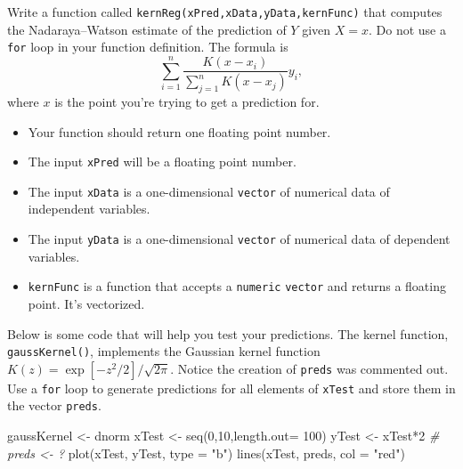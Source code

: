 \documentclass[
  12pt,
  krantz2]{krantz}
\makeatletter
\newenvironment{Shaded}{\begin{snugshade}}{\end{snugshade}}
\newcommand{\AttributeTok}[1]{\textcolor[rgb]{0.61,0.61,0.61}{#1}}
\newcommand{\CommentTok}[1]{\textcolor[rgb]{0.37,0.37,0.37}{\textit{#1}}}
\newcommand{\DecValTok}[1]{\textcolor[rgb]{0.06,0.06,0.06}{#1}}
\newcommand{\FunctionTok}[1]{\textcolor[rgb]{0,0,0}{#1}}
\newcommand{\NormalTok}[1]{#1}
\newcommand{\OtherTok}[1]{\textcolor[rgb]{0.37,0.37,0.37}{#1}}
\newcommand{\SpecialCharTok}[1]{\textcolor[rgb]{0,0,0}{#1}}
\newcommand{\StringTok}[1]{\textcolor[rgb]{0.5,0.5,0.5}{#1}}
\providecommand{\tightlist}{%
  \setlength{\itemsep}{0pt}\setlength{\parskip}{0pt}}
\newenvironment{kframe}{%
\medskip{}
\setlength{\fboxsep}{.8em}
 \def\at@end@of@kframe{}%
 \ifinner\ifhmode%
  \def\at@end@of@kframe{\end{minipage}}%
  \begin{minipage}{\columnwidth}%
 \fi\fi%
 \def\FrameCommand##1{\hskip\@totalleftmargin \hskip-\fboxsep
 \colorbox{shadecolor}{##1}\hskip-\fboxsep
     \hskip-\linewidth \hskip-\@totalleftmargin \hskip\columnwidth}%
 \MakeFramed {\advance\hsize-\width
   \@totalleftmargin\z@ \linewidth\hsize
   \@setminipage}}%
 {\par\unskip\endMakeFramed%
 \at@end@of@kframe}
\renewenvironment{Shaded}{\begin{kframe}}{\end{kframe}}
\makeatother
\begin{document}
Write a function called \texttt{kernReg(xPred,xData,yData,kernFunc)} that computes the Nadaraya--Watson estimate of the prediction of \(Y\) given \(X=x\). Do not use a \texttt{for} loop in your function definition. The formula is
\begin{equation} 
\sum_{i=1}^n \frac{K(x-x_i)}{\sum_{j=1}^n K(x-x_j) } y_i,
\end{equation}
where \(x\) is the point you're trying to get a prediction for.

\begin{itemize}
\tightlist
\item
  Your function should return one floating point number.
\item
  The input \texttt{xPred} will be a floating point number.
\item
  The input \texttt{xData} is a one-dimensional \texttt{vector} of numerical data of independent variables.
\item
  The input \texttt{yData} is a one-dimensional \texttt{vector} of numerical data of dependent variables.
\item
  \texttt{kernFunc} is a function that accepts a \texttt{numeric} \texttt{vector} and returns a floating point. It's vectorized.
\end{itemize}

Below is some code that will help you test your predictions. The kernel function, \texttt{gaussKernel()}, implements the Gaussian kernel function \(K(z) = \exp[-z^2/2]/\sqrt{2\pi}\). Notice the creation of \texttt{preds} was commented out. Use a \texttt{for} loop to generate predictions for all elements of \texttt{xTest} and store them in the vector \texttt{preds}.

\begin{Shaded}
\begin{Highlighting}[]
\NormalTok{gaussKernel }\OtherTok{\textless{}{-}}\NormalTok{ dnorm}
\NormalTok{xTest }\OtherTok{\textless{}{-}} \FunctionTok{seq}\NormalTok{(}\DecValTok{0}\NormalTok{,}\DecValTok{10}\NormalTok{,}\AttributeTok{length.out=} \DecValTok{100}\NormalTok{)}
\NormalTok{yTest }\OtherTok{\textless{}{-}}\NormalTok{ xTest}\SpecialCharTok{*}\DecValTok{2} 
\CommentTok{\# preds \textless{}{-} ?}
\FunctionTok{plot}\NormalTok{(xTest, yTest, }\AttributeTok{type =} \StringTok{"b"}\NormalTok{)}
\FunctionTok{lines}\NormalTok{(xTest, preds, }\AttributeTok{col =} \StringTok{"red"}\NormalTok{)}
\end{Highlighting}
\end{Shaded}
\end{document}
